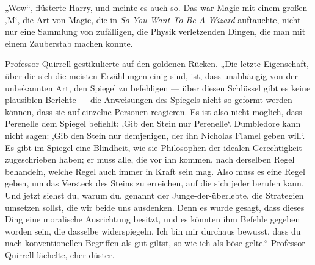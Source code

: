 „Wow“, flüsterte Harry, und meinte es auch so. Das war Magie mit einem großen ‚M‘, die Art von Magie, die in \emph{So You Want To Be A Wizard} auftauchte, nicht nur eine Sammlung von zufälligen, die Physik verletzenden Dingen, die man mit einem Zauberstab machen konnte.

Professor Quirrell gestikulierte auf den goldenen Rücken.
„Die letzte Eigenschaft, über die sich die meisten Erzählungen einig sind, ist, dass unabhängig von der unbekannten Art, den Spiegel zu befehligen — über diesen Schlüssel gibt es keine plausiblen Berichte — die Anweisungen des Spiegels nicht so geformt werden können, dass sie auf einzelne Personen reagieren. Es ist also nicht möglich, dass Perenelle dem Spiegel befiehlt: ‚Gib den Stein nur Perenelle‘. Dumbledore kann nicht sagen: ‚Gib den Stein nur demjenigen, der ihn Nicholas Flamel geben will‘. Es gibt im Spiegel eine Blindheit, wie sie Philosophen der idealen Gerechtigkeit zugeschrieben haben; er muss alle, die vor ihn kommen, nach derselben Regel behandeln, welche Regel auch immer in Kraft sein mag. Also muss es eine Regel geben, um das Versteck des Steins zu erreichen, auf die sich jeder berufen kann. Und jetzt siehst du, warum du, genannt der Junge-der-überlebte, die Strategien umsetzen sollst, die wir beide uns ausdenken. Denn es wurde gesagt, dass dieses Ding eine moralische Ausrichtung besitzt, und es könnten ihm Befehle gegeben worden sein, die dasselbe widerspiegeln. Ich bin mir durchaus bewusst, dass du nach konventionellen Begriffen als gut giltst, so wie ich als böse gelte.“ Professor Quirrell lächelte, eher düster.
